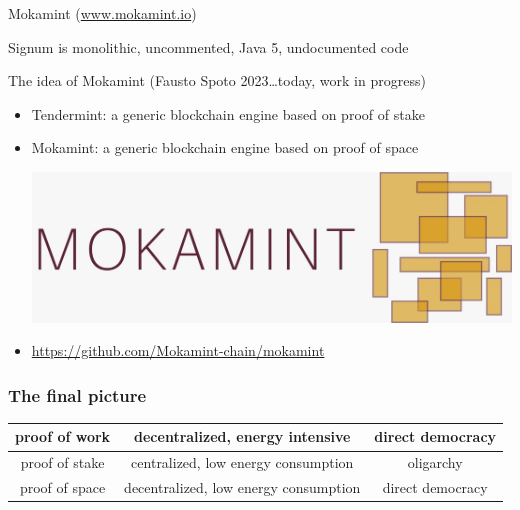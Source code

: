 \documentclass[11pt]{beamer}  %
\begin{document}
\begin{frame}{Mokamint (\url{www.mokamint.io})}

  Signum is monolithic, uncommented, Java 5, undocumented code

  \bigskip
  \bigskip

  \begin{greenbox}{The idea of Mokamint (Fausto Spoto 2023\ldots today, work in progress)}
    \begin{itemize}
    \item Tendermint: a generic blockchain engine based on proof of stake
    \item Mokamint: a generic blockchain engine based on proof of space
      \begin{center}
        \includegraphics[scale=0.1,clip=false]{pictures/mokamint_colors.jpg}
      \end{center}
    \item \url{https://github.com/Mokamint-chain/mokamint}
    \end{itemize}
  \end{greenbox}

\end{frame}

\begin{frame}\frametitle{The final picture}

  \begin{center}
    \begin{tabular}{c||c|c}
      proof of work & decentralized, energy intensive & direct democracy \\\hline
      proof of stake & centralized, low energy consumption & oligarchy \\\hline
      proof of space & decentralized, low energy consumption & direct democracy
    \end{tabular}
  \end{center}
  
\end{frame}
\end{document}
